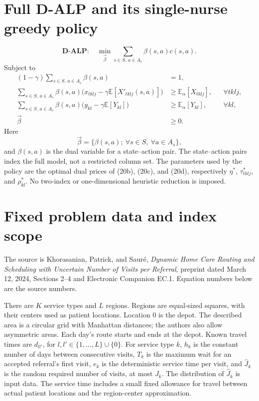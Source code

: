 \documentclass{article}
\begin{document}
\section*{Full D-ALP and its single-nurse greedy policy}
\begin{equation}
\mathbf{D\text{-}ALP}:\quad
\min_{\vec\beta}\sum_{s\in S,\,a\in A_s}\beta(s,a)c(s,a).
\tag{20a}
\end{equation}
Subject to
\begin{align}
(1-\gamma)\sum_{s\in S,\,a\in A_s}\beta(s,a)&=1,\tag{20b}\\
\sum_{s\in S,\,a\in A_s}\beta(s,a)
\bigl(x_{tklj}-\gamma\mathbb E[X'_{tklj}(s,a)]\bigr)
&\geq\mathbb E_\alpha[X_{tklj}],&&\forall tklj,\tag{20c}\\
\sum_{s\in S,\,a\in A_s}\beta(s,a)
\bigl(y_{kl}-\gamma\mathbb E[Y_{kl}]\bigr)
&\geq\mathbb E_\alpha[Y_{kl}],&&\forall kl,\tag{20d}\\
\vec\beta&\geq0.\tag{20e}
\end{align}
Here
\[
\vec\beta=\{\beta(s,a);\ \forall s\in S,\ \forall a\in A_s\},
\]
and $\beta(s,a)$ is the dual variable for a state--action pair. The state--action pairs index the full model, not a restricted column set. The parameters used by the policy are the optimal dual prices of (20b), (20c), and (20d), respectively $\eta^*$, $\tau^*_{tklj}$, and $\rho^*_{kl}$. No two-index or one-dimensional heuristic reduction is imposed.

\section*{Fixed problem data and index scope}
The source is Khorasanian, Patrick, and Saur\'e, \emph{Dynamic Home Care Routing and Scheduling with Uncertain Number of Visits per Referral}, preprint dated March 12, 2024, Sections 2--4 and Electronic Companion EC.1. Equation numbers below are the source numbers.

There are $K$ service types and $L$ regions. Regions are equal-sized squares, with their centers used as patient locations. Location $0$ is the depot. The described area is a circular grid with Manhattan distances; the authors also allow asymmetric areas. Each day's route starts and ends at the depot. Known travel times are $d_{ll'}$, for $l,l'\in\{1,\ldots,L\}\cup\{0\}$. For service type $k$, $h_k$ is the constant number of days between consecutive visits, $T_k$ is the maximum wait for an accepted referral's first visit, $e_k$ is the deterministic service time per visit, and $\hat J_k$ is the random required number of visits, at most $J_k$. The distribution of $\hat J_k$ is input data. The service time includes a small fixed allowance for travel between actual patient locations and the region-center approximation.
\end{document}
